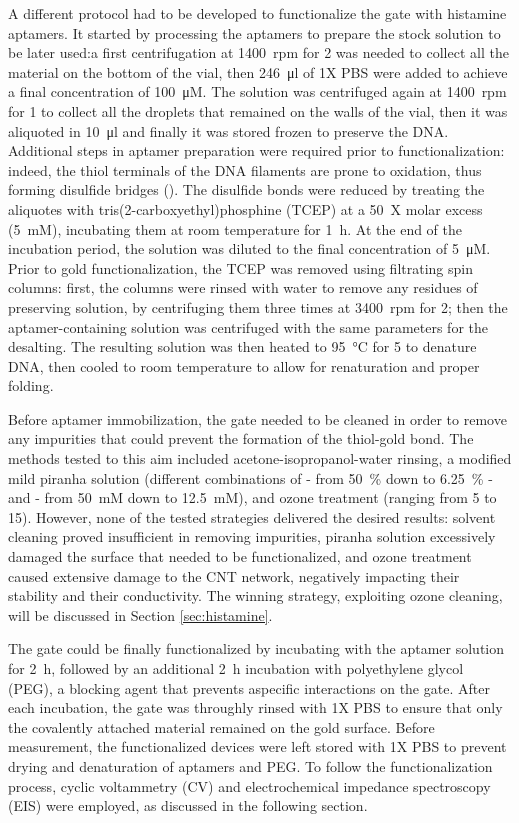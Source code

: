 A different protocol had to be developed to functionalize the gate with histamine aptamers. It started by processing the aptamers to prepare the stock solution to be later used:a first centrifugation at \SI{1400}{rpm} for \SI{2}{\min} was needed to collect all the material on the bottom of the vial, then 
\SI{246}{\ul} of 1X PBS were added to achieve a final concentration of \SI{100}{\micro M}. The solution was centrifuged again at \SI{1400}{rpm} for \SI{1}{\min} to collect all the droplets that remained on the walls of the vial, then it was aliquoted in \SI{10}{\ul} and finally it was stored frozen to preserve the DNA. Additional steps in aptamer preparation were required prior to functionalization: indeed, the thiol terminals of the DNA filaments are prone to oxidation, thus forming disulfide bridges (). The disulfide bonds were reduced by treating the aliquotes with tris(2-carboxyethyl)phosphine (TCEP) at a \SI{50}{X} molar excess (\SI{5}{mM}), incubating them at room temperature for \SI{1}{\hour}. At the end of the incubation period, the solution was diluted to the final concentration of \SI{5}{\micro M}. Prior to gold functionalization, the TCEP was removed using filtrating spin columns: first, the columns were rinsed with water to remove any residues of preserving solution, by centrifuging them three times at \SI{3400}{rpm} for \SI{2}{\min}; then the aptamer-containing solution was centrifuged with the same parameters for the desalting. The resulting solution was then heated to \SI{95}{\celsius} for \SI{5}{\min} to denature DNA, then cooled to room temperature to allow for renaturation and proper folding.

Before aptamer immobilization, the gate needed to be cleaned in order to remove any impurities that could prevent the formation of the thiol-gold bond. The methods tested to this aim included acetone-isopropanol-water rinsing, a modified mild piranha solution (different combinations of  - from \SI{50}{\%} down to \SI{6.25}{\%} - and  - from \SI{50}{mM} down to \SI{12.5}{mM}), and ozone treatment (ranging from \SI{5}{\min} to \SI{15}{\min}). However, none of the tested strategies delivered the desired results: solvent cleaning proved insufficient in removing impurities, piranha solution excessively damaged the surface that needed to be functionalized, and ozone treatment caused extensive damage to the CNT network, negatively impacting their stability and their conductivity. The winning strategy, exploiting ozone cleaning, will be discussed in Section \ref{sec:histamine}.

The gate could be finally functionalized by incubating with the aptamer solution for \SI{2}{\hour}, followed by an additional \SI{2}{\hour} incubation with polyethylene glycol (PEG), a blocking agent that prevents aspecific interactions on the gate. After each incubation, the gate was throughly rinsed with 1X PBS to ensure that only the covalently attached material remained on the gold surface. Before measurement, the functionalized devices were left stored with 1X PBS to prevent drying and denaturation of aptamers and PEG. To follow the functionalization process, cyclic voltammetry (CV) and electrochemical impedance spectroscopy (EIS) were employed, as discussed in the following section.

